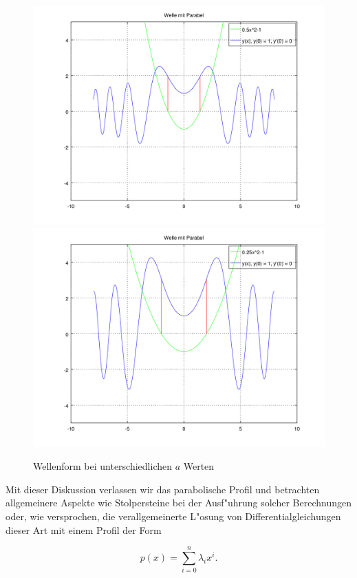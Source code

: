 \begin{figure}
	\includegraphics[scale=0.35]{./wellen/images/vara/ahalbe.png}
	\includegraphics[scale=0.35]{./wellen/images/vara/aviertel.png}
	\caption{Wellenform bei unterschiedlichen $a$ Werten}
	\label{fig:wellen:variablea}
\end{figure}

Mit dieser Diskussion verlassen wir das parabolische Profil und betrachten 
allgemeinere Aspekte wie Stolpersteine bei der Ausf"uhrung solcher Berechnungen 
oder, wie versprochen, die verallgemeinerte L"osung von Differentialgleichungen 
dieser Art mit einem Profil der Form

\begin{equation*}
p(x) = \sum_{i=0}^{n} \lambda_i x^i.
\end{equation*}

